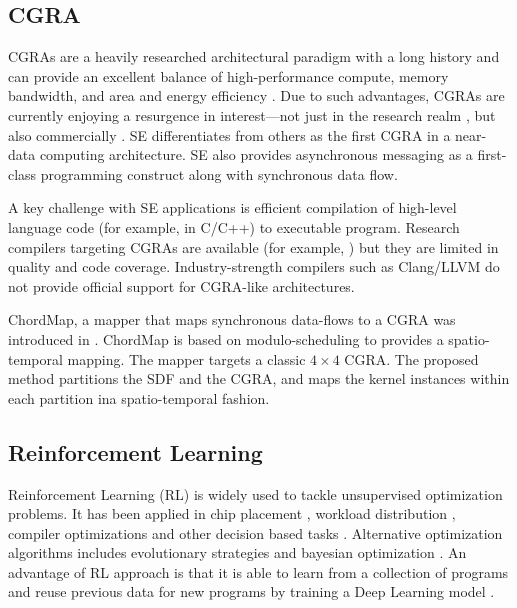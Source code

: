 \subsection{CGRA}
CGRAs are a heavily researched architectural paradigm with a long history and can provide an excellent balance of high-performance compute, memory bandwidth, and area and energy efficiency \cite{theodoridis2007survey}.
Due to such advantages, CGRAs are currently enjoying a resurgence in interest—not just in the research realm \cite{prabhakar2018plasticine}, but also commercially \cite{morgan2018intel, nicol2017coarse, vissers2019versal}.
SE differentiates from others as the first CGRA in a near-data computing architecture.
SE also provides asynchronous messaging as a first-class programming construct along with synchronous data flow. 

A key challenge with SE applications is efficient compilation of high-level language code (for example, in C/C++) to executable program. 
Research compilers targeting CGRAs are available (for example, \cite{adriaansen2016code, chin2017cgra, mei2003exploiting, prabhakar2018plasticine}) but they are limited in quality and code coverage. 
Industry-strength compilers such as Clang/LLVM do not provide official support for CGRA-like architectures.

ChordMap, a mapper that maps synchronous data-flows to a CGRA was introduced in \cite{li_chordmap_2022}.
ChordMap is based on modulo-scheduling to provides a spatio-temporal mapping.
The mapper targets a classic $4\times4$ CGRA.
The proposed method partitions the SDF and the CGRA, and maps the kernel instances within each partition ina spatio-temporal fashion.



\subsection{Reinforcement Learning}
Reinforcement Learning (RL) is widely used to tackle unsupervised optimization problems.
It has been applied in chip placement \cite{mirhoseini2020chip}, workload distribution \cite{Mirhoseini_placementRNN, addanki2019placeto, zhou2019gdp}, compiler optimizations \cite{Zhou_compileGNN} and other decision based tasks \cite{kormushev2013reinforcement, ZophL16_NASRL}. 
Alternative optimization algorithms includes evolutionary strategies \cite{Zhichao_ESNAS} and bayesian optimization \cite{shi2020learned}. 
An advantage of RL approach is that it is able to learn from a collection of programs and reuse previous data for new programs by training a Deep Learning model \cite{zhou2019gdp}.

